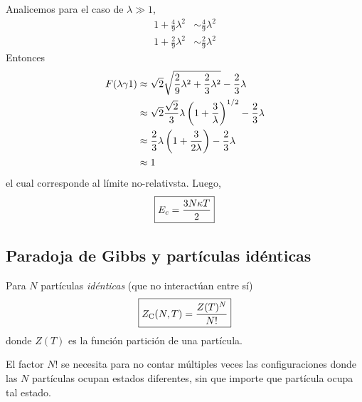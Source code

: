 \begin{sol}
Analicemos para el caso de $\lambda\gg 1$,
\begin{align}
  1+\frac{4}{9}\lambda^2&\sim \frac{4}{9}\lambda^2\\
  1+\frac{2}{9}\lambda^2&\sim \frac{2}{9}\lambda^2
\end{align}
Entonces
\begin{align}
  F(\lambda\gamma 1)&\approx \sqrt{2}\sqrt{\frac{2}{9}\lambda^2+\frac{2}{3}\lambda^2}-\frac{2}{3}\lambda \\
  &\approx \sqrt{2}\frac{\sqrt{2}}{3}\lambda\left(1+\frac{3}{\lambda}\right)^{1/2}-\frac{2}{3}\lambda\\
  &\approx \frac{2}{3}\lambda\left(1+\frac{3}{2\lambda}\right)-\frac{2}{3}\lambda\\
  &\approx 1
\end{align}
el cual corresponde al límite no-relativsta. Luego,
\begin{equation}
\boxed{  E_c=\frac{3N\kappa T}{2}}
\end{equation}











\end{sol}

\subsection{Paradoja de Gibbs y partículas idénticas}
Para $N$ partículas \textit{idénticas} (que no interactúan entre sí)
\begin{equation}
 \boxed{ Z_{\rm C} (N,T)=\frac{Z(T)^N}{N!}}
\end{equation}
donde $Z(T)$ es la función partición de una partícula.

El factor $N!$ se necesita para no contar múltiples veces las configuraciones donde las $N$ partículas ocupan estados diferentes, sin que importe que partícula ocupa tal estado.

